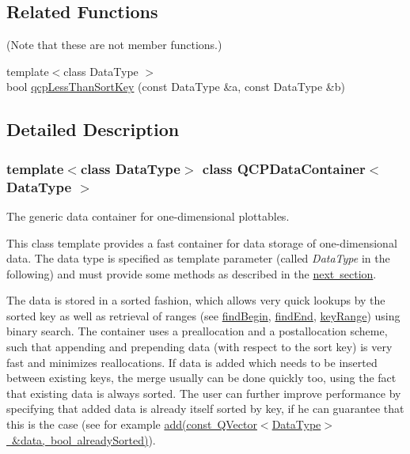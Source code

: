 \subsection*{Related Functions}
(Note that these are not member functions.) \begin{DoxyCompactItemize}
\item 
{\footnotesize template$<$class Data\+Type $>$ }\\bool \mbox{\hyperlink{class_q_c_p_data_container_a74c5e06728cb6fa778a25d9ec0c4bd36}{qcp\+Less\+Than\+Sort\+Key}} (const Data\+Type \&a, const Data\+Type \&b)
\end{DoxyCompactItemize}


\subsection{Detailed Description}
\subsubsection*{template$<$class Data\+Type$>$\newline
class Q\+C\+P\+Data\+Container$<$ Data\+Type $>$}

The generic data container for one-\/dimensional plottables. 

This class template provides a fast container for data storage of one-\/dimensional data. The data type is specified as template parameter (called {\itshape Data\+Type} in the following) and must provide some methods as described in the \mbox{\hyperlink{class_q_c_p_data_container_qcpdatacontainer-datatype}{next section}}.

The data is stored in a sorted fashion, which allows very quick lookups by the sorted key as well as retrieval of ranges (see \mbox{\hyperlink{class_q_c_p_data_container_a2ad8a5399072d99a242d3a6d2d7e278a}{find\+Begin}}, \mbox{\hyperlink{class_q_c_p_data_container_afb8b8f23cc2b7234a793a25ce79fe48f}{find\+End}}, \mbox{\hyperlink{class_q_c_p_data_container_aba6e1a93c21ccc56a432b4a02c9d0ed2}{key\+Range}}) using binary search. The container uses a preallocation and a postallocation scheme, such that appending and prepending data (with respect to the sort key) is very fast and minimizes reallocations. If data is added which needs to be inserted between existing keys, the merge usually can be done quickly too, using the fact that existing data is always sorted. The user can further improve performance by specifying that added data is already itself sorted by key, if he can guarantee that this is the case (see for example \mbox{\hyperlink{class_q_c_p_data_container_a51d2a4c9ce4baf5e950b767d26673972}{add(const Q\+Vector$<$\+Data\+Type$>$ \&data, bool already\+Sorted)}}).

